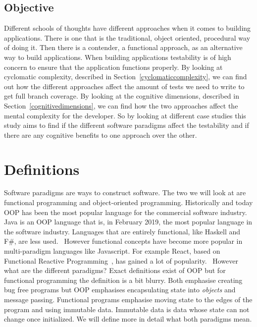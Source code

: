 \documentclass[12pt]{report}
\theoremstyle{definition}
\theoremstyle{theorem}
\begin{document}
\section{Objective}

Different schools of thoughts have different approaches when it comes to
building applications. There is one that is the traditional, object oriented,
procedural way of doing it. Then there is a contender, a functional approach, as
an alternative way to build applications. When building applications testability
is of high concern to ensure that the application functions properly. By looking
at cyclomatic complexity, described in Section~\ref{cyclomaticcomplexity}, we
can find out how the different approaches affect the amount of tests we need to
write to get full branch coverage. By looking at the cognitive dimensions,
described in Section~\ref{cognitivedimensions}, we can find how the two
approaches affect the mental complexity for the developer. So by looking at
different case studies this study aims to find if the different software
paradigms affect the testability and if there are any cognitive benefits to one
approach over the other. 

\chapter{Definitions}\label{theory}

Software paradigms are ways to construct software. The two we will look at are
functional programming and object-oriented programming. Historically and today
OOP has been the most popular language for the commercial software industry.
Java is an OOP language that is, in February 2019, the most popular language in
the software industry. Languages that are entirely functional, like Haskell and
F\#, are less used.~\cite{tiobe} However functional concepts have become more
popular in multi-paradigm languages like Javascript. For example React, based on
Functional Reactive Programming~\cite{reactisfrp}, has gained a lot of
popularity.~\cite{popularityreact} However what are the different paradigms?
Exact definitions exist of OOP but for functional programming the definition is
a bit blurry. Both emphasise creating bug free programs but OOP emphasises
encapsulating state into \textit{objects} and message passing. Functional
programs emphasise moving state to the edges of the program and using immutable
data. Immutable data is data whose state can not change once initialized. We
will define more in detail what both paradigms mean.
\end{document}
